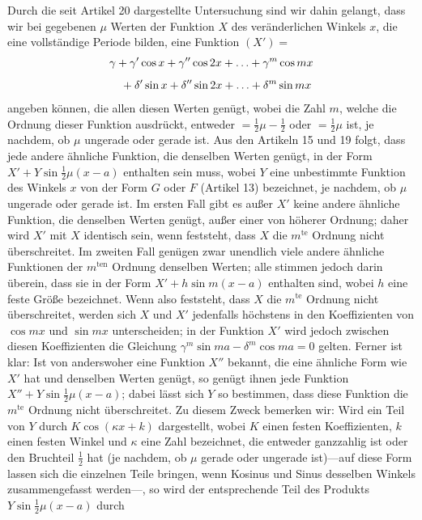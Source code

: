 \begingroup
\renewcommand{\arraystretch}{1.45}
Durch die seit Artikel 20 dargestellte Untersuchung sind wir dahin gelangt, dass wir bei gegebenen $\mu$
Werten der Funktion $X$ des veränderlichen Winkels $x$, die eine vollständige Periode bilden, eine Funktion $(X')=$
\[
\begin{aligned}
&\gamma+\gamma'\cos x+\gamma''\cos2x+\mathinner{.\,.\,.}+\gamma^m\cos mx\\[5pt]
&\quad+\delta'\sin x+\delta''\sin2x+\mathinner{.\,.\,.}+\delta^m\sin mx
\end{aligned}
\]
angeben können, die allen diesen Werten genügt, wobei die Zahl $m$, welche die Ordnung dieser Funktion ausdrückt, entweder $=\frac12\mu-\frac12$ oder $=\frac12\mu$ ist, je nachdem, ob $\mu$ ungerade oder
gerade ist. Aus den Artikeln 15 und 19 folgt, dass jede andere ähnliche Funktion, die denselben Werten genügt, in der Form $X'+Y\sin\frac12\mu(x-a)$ enthalten sein muss,
wobei $Y$ eine unbestimmte Funktion des Winkels $x$ von der Form $G$ oder $F$ (Artikel 13) bezeichnet, je nachdem, ob $\mu$
ungerade oder gerade ist. Im ersten Fall gibt es außer $X'$ keine andere ähnliche Funktion, die denselben
Werten genügt, außer einer von höherer Ordnung; daher wird $X'$ mit $X$ identisch sein, wenn
feststeht, dass $X$ die $m^{\mathrm{te}}$ Ordnung nicht überschreitet. Im zweiten Fall genügen zwar unendlich viele
andere ähnliche Funktionen der $m^{\mathrm{ten}}$ Ordnung denselben Werten; alle stimmen jedoch darin
überein, dass sie in der Form $X'+h\sin m(x-a)$ enthalten sind, wobei
$h$ eine feste Größe bezeichnet. Wenn also feststeht, dass $X$ die $m^{\mathrm{te}}$ Ordnung nicht überschreitet,
werden sich $X$ und $X'$ jedenfalls höchstens in den Koeffizienten von $\cos mx$ und $\sin mx$
unterscheiden; in der Funktion $X'$ wird jedoch zwischen diesen Koeffizienten die Gleichung
$\gamma^m\sin ma-\delta^m\cos ma=0$ gelten. Ferner ist klar: Ist von anderswoher eine Funktion $X''$ bekannt, die eine ähnliche Form wie $X'$ hat und denselben Werten genügt, so genügt ihnen jede Funktion $X''+Y\sin\frac12\mu(x-a)$; dabei lässt sich $Y$ so bestimmen, dass diese Funktion die $m^{\mathrm{te}}$ Ordnung nicht überschreitet. 
Zu diesem Zweck bemerken wir: Wird ein Teil von $Y$ durch $K\cos(\kappa x+k)$ dargestellt, wobei $K$
einen festen Koeffizienten, $k$ einen festen Winkel und $\kappa$ eine Zahl bezeichnet, die entweder ganzzahlig ist oder den Bruchteil
$\frac12$ hat (je nachdem, ob $\mu$ gerade oder ungerade ist)---auf diese Form lassen sich die einzelnen Teile bringen, wenn Kosinus und Sinus desselben Winkels zusammengefasst werden---, so wird der entsprechende Teil des Produkts $Y\sin\frac12\mu(x-a)$ durch
